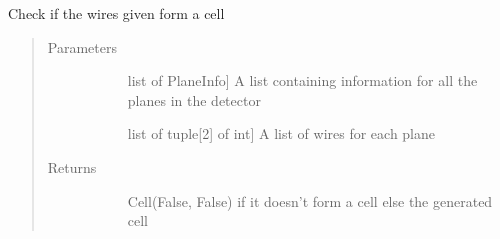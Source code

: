 \documentclass[letterpaper,10pt,english]{sphinxmanual}
\begin{document}
\begin{fulllineitems}
\label{\detokenize{geometryReco:geometryReco.checkCell}}
Check if the wires given form a cell
\begin{quote}\begin{description}
\item[{Parameters}] \leavevmode\begin{description}
\item[{}] \leavevmode{[}list of PlaneInfo{]}
A list containing information for all the planes in the detector

\item[{}] \leavevmode{[}list of tuple{[}2{]} of int{]}
A list of wires for each plane

\end{description}

\item[{Returns}] \leavevmode\begin{description}
\item[{}] \leavevmode
Cell(False, False) if it doesn’t form a cell else the generated cell

\end{description}

\end{description}\end{quote}

\end{fulllineitems}

\end{document}
